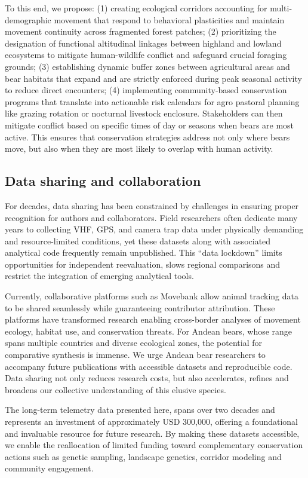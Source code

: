 \documentclass[lineno,referee,pdflatex,sn-vancouver-num]{sn-jnl}%
\theoremstyle{thmstyleone}%
\theoremstyle{thmstyletwo}%
\theoremstyle{thmstylethree}%
\begin{document}
To this end, we propose: (1) creating ecological corridors accounting for multi-demographic movement that respond to behavioral plasticities and maintain movement continuity across fragmented forest patches;
(2) prioritizing the designation of functional altitudinal linkages between highland and lowland ecosystems to mitigate human-wildlife conflict and safeguard crucial foraging grounds;
(3) establishing dynamic buffer zones between agricultural areas and bear habitats that expand and are strictly enforced during peak seasonal activity to reduce direct encounters;
(4) implementing community-based conservation programs that translate into actionable risk calendars for agro pastoral planning like grazing rotation or nocturnal livestock enclosure.
Stakeholders can then mitigate conflict based on specific times of day or seasons when bears are most active.
This ensures that conservation strategies address not only where bears move, but also when they are most likely to overlap with human activity.

\subsection{Data sharing and collaboration}

For decades, data sharing has been constrained by challenges in ensuring proper recognition for authors and collaborators. Field researchers often dedicate many years to collecting VHF, GPS, and camera trap data under physically demanding and resource-limited conditions, yet these datasets along with associated
analytical code frequently remain unpublished.
This ``data lockdown'' limits opportunities for independent reevaluation, slows regional comparisons and
restrict the integration of emerging analytical tools.

Currently, collaborative platforms such as Movebank allow
animal tracking data to be shared seamlessly while guaranteeing contributor attribution.
These platforms have transformed research enabling cross-border analyses of movement
ecology, habitat use, and conservation threats. For Andean bears, whose range spans
multiple countries and diverse ecological zones, the potential for comparative synthesis
is immense. We urge Andean bear researchers to accompany future publications with accessible datasets
and reproducible code. Data sharing not only reduces research costs, but also
accelerates, refines and broadens our collective understanding of this elusive species.

The long-term telemetry data presented here, spans over two decades and represents an investment of approximately USD 300,000, offering a foundational and invaluable resource for future research.
By making these datasets accessible, we enable the reallocation of limited funding toward complementary conservation actions such as genetic sampling, landscape genetics, corridor modeling and community engagement.
\end{document}
